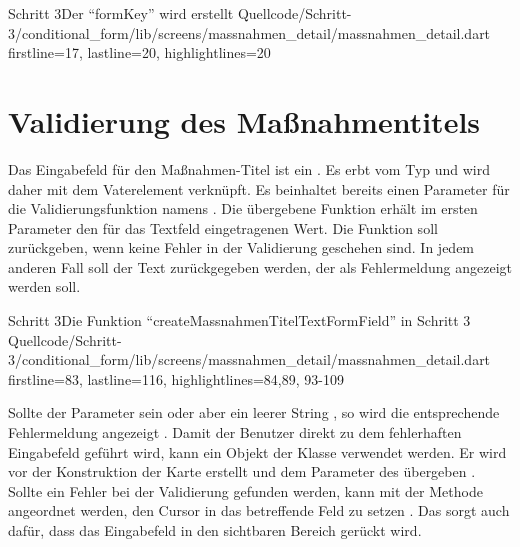 \begin{alexlisting}{Schritt 3}{Der \enquote{formKey} wird erstellt}
    {Quellcode/Schritt-3/conditional_form/lib/screens/massnahmen_detail/massnahmen_detail.dart}
    {firstline=17, lastline=20, highlightlines={20}}
    \label{lst:Schritt3FormState}
\end{alexlisting}

\section{Validierung des Maßnahmentitels}

Das Eingabefeld für den Maßnahmen-Titel ist ein  .
Es erbt vom Typ  und wird daher mit dem Vaterelement  verknüpft.
Es beinhaltet bereits einen Parameter für die Validierungsfunktion namens  .
Die übergebene Funktion erhält im ersten Parameter den für das Textfeld eingetragenen Wert.
Die Funktion soll  zurückgeben, wenn keine Fehler in der Validierung geschehen sind.
In jedem anderen Fall soll der Text zurückgegeben werden, der als Fehlermeldung angezeigt werden soll.

\begin{alexlisting}{Schritt 3}{Die Funktion \enquote{createMassnahmenTitelTextFormField} in Schritt 3}
    {Quellcode/Schritt-3/conditional_form/lib/screens/massnahmen_detail/massnahmen_detail.dart}
    {firstline=83, lastline=116, highlightlines={84,89, 93-109}}
    \label{lst:Schritt3createMassnahmenTitelTextFormFieldValidator}
\end{alexlisting}

Sollte der Parameter  sein oder aber ein leerer String , so wird die entsprechende Fehlermeldung  angezeigt .
Damit der Benutzer direkt zu dem fehlerhaften Eingabefeld geführt wird, kann ein Objekt der Klasse  verwendet werden.
Er wird vor der Konstruktion der Karte erstellt  und dem Parameter  des  übergeben .
Sollte ein Fehler bei der Validierung gefunden werden, kann mit der Methode  angeordnet werden, den Cursor in das betreffende Feld zu setzen .
Das sorgt auch dafür, dass das Eingabefeld in den sichtbaren Bereich gerückt wird.

